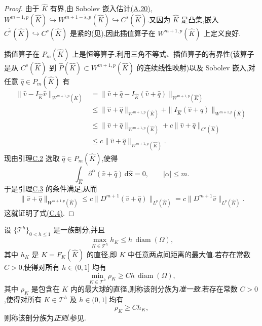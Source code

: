 \begin{proof}
由于 $\widehat K$ 有界,由 Sobolev 嵌入估计\hyperref[eq:appendix-a-20]{(A.20)},
$W^{m+1,p}(\widehat K)\hookrightarrow W^{m+1-\widetilde s,p}(\widehat K)\hookrightarrow C^{\widetilde s}(\widehat K)$.又因为 $\widehat K$ 是凸集,嵌入
$C^{\widetilde s}(\widehat K)\hookrightarrow C^s(\widehat K)$ 是紧的(见\textcite[定理 1.31]{Adams1975}),因此插值算子在 $W^{m+1,p}(\widehat K)$ 上定义良好.

插值算子在 $P_m(\widehat K)$ 上是恒等算子.利用三角不等式、插值算子的有界性(该算子是从 $C^s(\widehat K)$ 到 $\widehat P(\widehat K)\subset W^{m+1,p}(\widehat K)$ 的连续线性映射)以及 Sobolev 嵌入,对任意 $\widehat q\in P_m(\widehat K)$ 有
\[
\begin{aligned}
 \|\widehat v-I_{\widehat K}\widehat v\|_{W^{m+1,p}(\widehat K)}
 &=\|\widehat v+\widehat q-I_{\widehat K}(\widehat v+\widehat q)\|_{W^{m+1,p}(\widehat K)}\\
 &\le\|\widehat v+\widehat q\|_{W^{m+1,p}(\widehat K)}
   +\|I_{\widehat K}(\widehat v+\widehat q)\|_{W^{m+1,p}(\widehat K)}\\
 &\le\|\widehat v+\widehat q\|_{W^{m+1,p}(\widehat K)}
   +c\|\widehat v+\widehat q\|_{C^s(\widehat K)}\\
 &\le c\|\widehat v+\widehat q\|_{W^{m+1,p}(\widehat K)}.
\end{aligned}
\]
现由引理\hyperref[lem:appendix-c-2]{C.2} 选取 $\widehat q\in P_m(\widehat K)$,使得
\[
 \int_{\widehat K}\partial^\alpha(\widehat v+\widehat q)
 \,\mathrm d\widehat{\bm x}=0,
 \qquad |\alpha|\le m.
\]
于是引理\hyperref[lem:appendix-c-3]{C.3} 的条件满足,从而
\[
 \|\widehat v+\widehat q\|_{W^{m+1,p}(\widehat K)}
 \le c\|D^{m+1}(\widehat v+\widehat q)\|_{L^p(\widehat K)}
 =c\|D^{m+1}\widehat v\|_{L^p(\widehat K)}.
\]
这就证明了式\hyperref[eq:appendix-c-4]{(C.4)}.
\end{proof}

\begin{definition}[准一致与正则剖分族]\label{def:appendix-c-9}
设 $\{\mathcal T^h\}_{0<h\le1}$ 是一族剖分,并且
\[
 \max_{K\in\mathcal T^h}h_K\le h\,\operatorname{diam}(\Omega),
\]
其中 $h_K$ 是 $K=F_K(\widehat K)$ 的直径,即 $K$ 中任意两点间距离的最大值.若存在常数 $C>0$,使得对所有 $h\in(0,1]$ 均有
\begin{equation}\label{eq:appendix-c-5}
 \min_{K\in\mathcal T^h}\rho_K
 \ge Ch\,\operatorname{diam}(\Omega),
\end{equation}
其中 $\rho_K$ 是包含在 $K$ 内的最大球的直径,则称该剖分族为\emph{准一致}.若存在常数 $C>0$,使得对所有 $K\in\mathcal T^h$ 及 $h\in(0,1]$ 均有
\[
 \rho_K\ge Ch_K,
\]
则称该剖分族为\emph{正则}.参见\textcite[定义 4.4.13]{BrennerScott2008}.
\end{definition}

